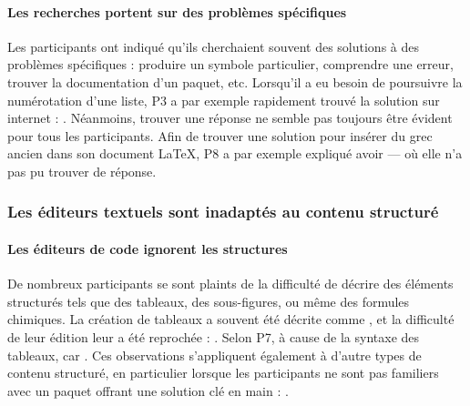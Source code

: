 \paragraph{Les recherches portent sur des problèmes spécifiques}
Les participants ont indiqué qu'ils cherchaient souvent des solutions à des problèmes spécifiques : produire un symbole particulier, comprendre une erreur, trouver la documentation d'un paquet, etc.
Lorsqu'il a eu besoin de poursuivre la numérotation d'une liste, P3 a par exemple rapidement trouvé la solution sur internet : .
Néanmoins, trouver une réponse ne semble pas toujours être évident pour tous les participants.
Afin de trouver une solution pour insérer du grec ancien dans son document \LaTeX{}, P8 a par exemple expliqué avoir  --- où elle n'a pas pu trouver de réponse.



\subsubsection{\printthemenumber{} Les éditeurs textuels sont inadaptés au contenu structuré}

\paragraph{Les éditeurs de code ignorent les structures}
De nombreux participants se sont plaints de la difficulté de décrire des éléments structurés tels que des tableaux, des sous-figures, ou même des formules chimiques.
La création de tableaux a souvent été décrite comme , et la difficulté de leur édition leur a été reprochée : .
Selon P7, à cause de la syntaxe des tableaux,  car .
Ces observations s'appliquent également à d'autre types de contenu structuré, en particulier lorsque les participants ne sont pas familiers avec un paquet offrant une solution clé en main : .

